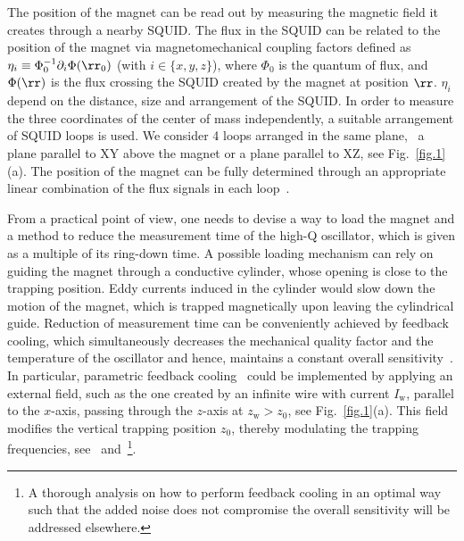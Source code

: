 \documentclass[twocolumn,superscriptaddress,floatfix,preprintnumbers,prl]{revtex4}
\begin{document}
The position of the magnet can be read out by measuring the magnetic field it creates through a nearby SQUID. 
The flux in the SQUID can be related to the position of the magnet via magnetomechanical coupling factors defined as
$\eta_i\equiv \Phi_0^{-1}\partial_i\Phi(\rr_0)$ (with $i\in\{x,y,z\}$), where $\Phi_0$ is the quantum of flux, and $\Phi(\rr)$ is the flux crossing the SQUID created by the magnet at position $\rr$.
$\eta_i$ depend on the distance, size and arrangement of the SQUID.
In order to measure the three coordinates of the center of mass independently, a suitable arrangement of SQUID loops is used. We consider 4 loops arranged in the same plane, \eg~a plane parallel to XY above the magnet or a plane parallel to XZ, see Fig.~\ref{fig.1}(a).
The position of the magnet can be fully determined through an appropriate linear combination of the flux signals in each loop~\cite{SM}. 

From a practical point of view,
one needs to devise a way to load the magnet and a method to reduce the measurement time of the high-Q oscillator, which is given as a multiple of its ring-down time. 
A possible loading mechanism can rely on guiding the magnet through a conductive cylinder, whose opening is close to the trapping position. Eddy currents induced in the cylinder would slow down the motion of the magnet, which is trapped magnetically upon leaving the cylindrical guide. Reduction of measurement time can be conveniently achieved by feedback cooling, which simultaneously decreases the mechanical quality factor and  the temperature of the oscillator and hence,  maintains a constant overall sensitivity~\cite{Geraci2010}.
 In particular, parametric feedback cooling~\cite{Gieseler2012} could be implemented by applying an external field, such as the one created by an infinite wire with current $I_\text{w}$, parallel to the $x$-axis, passing through the $z$-axis at $z_\text{w}>z_0$, see Fig.~\ref{fig.1}(a). This field modifies the vertical trapping position $z_0$, thereby modulating the trapping frequencies, see~\cite{SM} and~\footnote{A thorough analysis on how to perform feedback cooling in an optimal way such that the added noise does not compromise the overall sensitivity will be addressed elsewhere.}.
\end{document}

